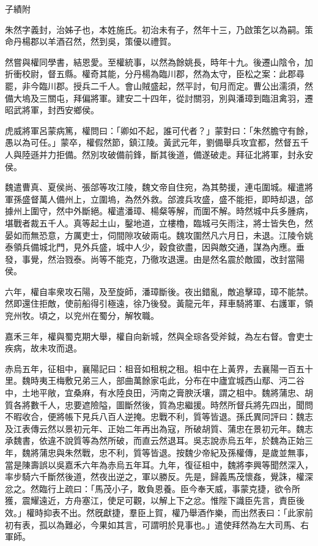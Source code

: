 
\begin{pinyinscope}
子績附

朱然字義封，治姊子也，本姓施氏。初治未有子，然年十三，乃啟策乞以為嗣。策命丹楊郡以羊酒召然，然到吳，策優以禮賀。

然嘗與權同學書，結恩愛。至權統事，以然為餘姚長，時年十九。後遷山陰令，加折衝校尉，督五縣。權奇其能，分丹楊為臨川郡，然為太守，臣松之案：此郡尋罷，非今臨川郡。授兵二千人。會山賊盛起，然平討，旬月而定。曹公出濡須，然備大塢及三關屯，拜偏將軍。建安二十四年，從討關羽，別與潘璋到臨沮禽羽，遷昭武將軍，封西安鄉侯。

虎威將軍呂蒙病篤，權問曰：「卿如不起，誰可代者？」蒙對曰：「朱然膽守有餘，愚以為可任。」蒙卒，權假然節，鎮江陵。黃武元年，劉備舉兵攻宜都，然督五千人與陸遜并力拒備。然別攻破備前鋒，斷其後道，備遂破走。拜征北將軍，封永安侯。

魏遣曹真、夏侯尚、張郃等攻江陵，魏文帝自住宛，為其勢援，連屯圍城。權遣將軍孫盛督萬人備州上，立圍塢，為然外救。郃渡兵攻盛，盛不能拒，即時却退，郃據州上圍守，然中外斷絕。權遣潘璋、楊粲等解，而圍不解。時然城中兵多腫病，堪戰者裁五千人。真等起土山，鑿地道，立樓櫓，臨城弓矢雨注，將士皆失色，然晏如而無恐意，方厲吏士，伺間隙攻破兩屯。魏攻圍然凡六月日，未退。江陵令姚泰領兵備城北門，見外兵盛，城中人少，穀食欲盡，因與敵交通，謀為內應。垂發，事覺，然治戮泰。尚等不能克，乃徹攻退還。由是然名震於敵國，改封當陽侯。

六年，權自率衆攻石陽，及至旋師，潘璋斷後。夜出錯亂，敵追擊璋，璋不能禁。然即還住拒敵，使前船得引極遠，徐乃後發。黃龍元年，拜車騎將軍、右護軍，領兖州牧。頃之，以兖州在蜀分，解牧職。

嘉禾三年，權與蜀克期大舉，權自向新城，然與全琮各受斧鉞，為左右督。會吏士疾病，故未攻而退。

赤烏五年，征柤中，襄陽記曰：柤音如租稅之租。柤中在上黃界，去襄陽一百五十里。魏時夷王梅敷兄弟三人，部曲萬餘家屯此，分布在中廬宜城西山鄢、沔二谷中，土地平敞，宜桑麻，有水陸良田，沔南之膏腴沃壤，謂之柤中。魏將蒲忠、胡質各將數千人，忠要遮險隘，圖斷然後，質為忠繼援。時然所督兵將先四出，聞問不暇收合，便將帳下見兵八百人逆掩。忠戰不利，質等皆退。孫氏異同評曰：魏志及江表傳云然以景初元年、正始二年再出為寇，所破胡質、蒲忠在景初元年。魏志承魏書，依違不說質等為然所破，而直云然退耳。吳志說赤烏五年，於魏為正始三年，魏將蒲忠與朱然戰，忠不利，質等皆退。按魏少帝紀及孫權傳，是歲並無事，當是陳壽誤以吳嘉禾六年為赤烏五年耳。九年，復征柤中，魏將李興等聞然深入，率步騎六千斷然後道，然夜出逆之，軍以勝反。先是，歸義馬茂懷姦，覺誅，權深忿之。然臨行上疏曰：「馬茂小子，敢負恩養。臣今奉天威，事蒙克捷，欲令所獲，震耀遠近，方舟塞江，使足可觀，以解上下之忿。惟陛下識臣先言，責臣後效。」權時抑表不出。然旣獻捷，羣臣上賀，權乃舉酒作樂，而出然表曰：「此家前初有表，孤以為難必，今果如其言，可謂明於見事也。」遣使拜然為左大司馬、右軍師。


\end{pinyinscope}

